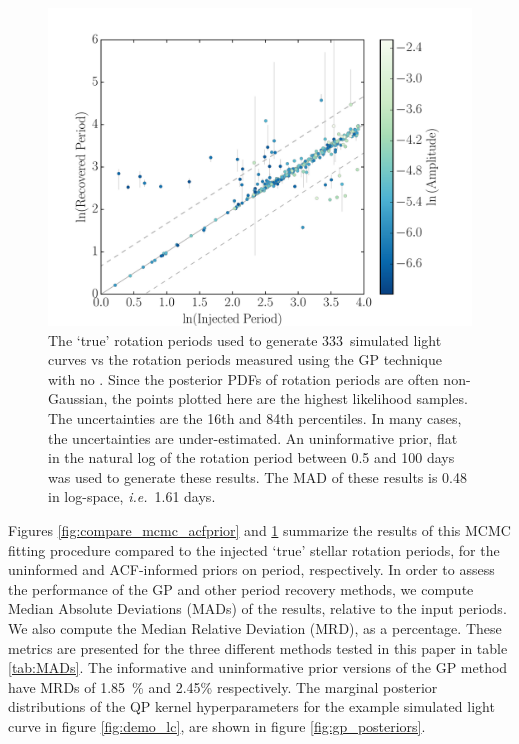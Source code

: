 \documentclass[useAMS, usenatbib, preprint, 12pt]{aastex}
\newcommand{\ie}{{\it i.e.}}
\newcommand{\naigrain}{333}
\newcommand{\percentgpMADnp}{2.45}
\newcommand{\percentgpMAD}{1.85}
\begin{document}
\begin{figure}
\begin{center}
\includegraphics[width=6in, clip=true]{figures/comparison_noprior_02_03.pdf}
\caption{The `true' rotation periods used to generate \naigrain\
simulated light curves vs the rotation periods measured using the GP
technique with no .
Since the posterior PDFs of rotation periods are often non-Gaussian,
the points plotted here are the highest likelihood samples.
The uncertainties are the 16th and 84th percentiles.
In many cases, the uncertainties are under-estimated.
An uninformative prior, flat in the natural log of the rotation period between
    0.5 and 100 days was used to generate these results.
The MAD of these results is 0.48 in log-space, \ie\ 1.61 days.
    }
\label{fig:compare_mcmc_noprior}
\end{center}
\end{figure}

Figures \ref{fig:compare_mcmc_acfprior} and \ref{fig:compare_mcmc_noprior}
summarize the results of this MCMC fitting procedure compared to the injected
`true' stellar rotation periods, for the uninformed and ACF-informed priors on
period, respectively.
In order to assess the performance of the GP and other period recovery
methods, we compute Median Absolute Deviations (MADs) of the results, relative
to the input periods.
We also compute the Median Relative Deviation (MRD), as a percentage.
These metrics are presented for the three different methods tested in this
paper in table \ref{tab:MADs}.
The informative and uninformative prior versions of the GP method have MRDs of
\percentgpMAD\ \% and \percentgpMADnp \% respectively.
The marginal posterior distributions of the QP kernel hyperparameters for the
example simulated light curve in figure \ref{fig:demo_lc}, are shown in
figure \ref{fig:gp_posteriors}.
\end{document}
